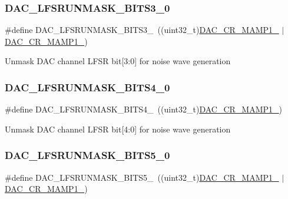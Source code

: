 \subsubsection{\texorpdfstring{DAC\_LFSRUNMASK\_BITS3\_0}{DAC\_LFSRUNMASK\_BITS3\_0}}
{\footnotesize\ttfamily \#define D\+A\+C\+\_\+\+L\+F\+S\+R\+U\+N\+M\+A\+S\+K\+\_\+\+B\+I\+T\+S3\+\_~((uint32\+\_\+t)\mbox{\hyperlink{group___peripheral___registers___bits___definition_ga6cc15817842cb7992d449c448684f68d}{D\+A\+C\+\_\+\+C\+R\+\_\+\+M\+A\+M\+P1\+\_}} $\vert$ \mbox{\hyperlink{group___peripheral___registers___bits___definition_ga4225dcce22b440fcd3a8ad96c5f2baec}{D\+A\+C\+\_\+\+C\+R\+\_\+\+M\+A\+M\+P1\+\_}})}

Unmask D\+AC channel L\+F\+SR bit\mbox{[}3\+:0\mbox{]} for noise wave generation \mbox{\label{group___d_a_c_ex__lfsrunmask__triangleamplitude_ga15f06fc14c8931cecea96186edcc4cfc}} 
\subsubsection{\texorpdfstring{DAC\_LFSRUNMASK\_BITS4\_0}{DAC\_LFSRUNMASK\_BITS4\_0}}
{\footnotesize\ttfamily \#define D\+A\+C\+\_\+\+L\+F\+S\+R\+U\+N\+M\+A\+S\+K\+\_\+\+B\+I\+T\+S4\+\_~((uint32\+\_\+t)\mbox{\hyperlink{group___peripheral___registers___bits___definition_ga0fefef1d798a2685b03e44bd9fdac06b}{D\+A\+C\+\_\+\+C\+R\+\_\+\+M\+A\+M\+P1\+\_}})}

Unmask D\+AC channel L\+F\+SR bit\mbox{[}4\+:0\mbox{]} for noise wave generation \mbox{\label{group___d_a_c_ex__lfsrunmask__triangleamplitude_gaf4ddf68e1ca3ff46f9dadc559ac3e16b}} 
\subsubsection{\texorpdfstring{DAC\_LFSRUNMASK\_BITS5\_0}{DAC\_LFSRUNMASK\_BITS5\_0}}
{\footnotesize\ttfamily \#define D\+A\+C\+\_\+\+L\+F\+S\+R\+U\+N\+M\+A\+S\+K\+\_\+\+B\+I\+T\+S5\+\_~((uint32\+\_\+t)\mbox{\hyperlink{group___peripheral___registers___bits___definition_ga0fefef1d798a2685b03e44bd9fdac06b}{D\+A\+C\+\_\+\+C\+R\+\_\+\+M\+A\+M\+P1\+\_}} $\vert$ \mbox{\hyperlink{group___peripheral___registers___bits___definition_ga4225dcce22b440fcd3a8ad96c5f2baec}{D\+A\+C\+\_\+\+C\+R\+\_\+\+M\+A\+M\+P1\+\_}})}

